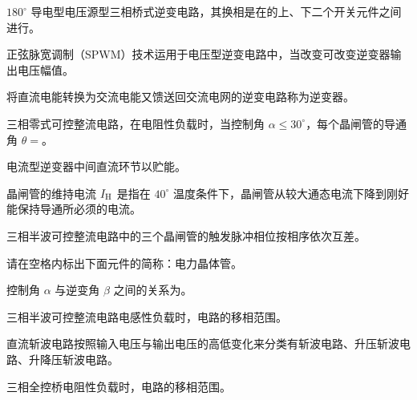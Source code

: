 \documentclass[电力电子]{subfiles}
\begin{document}
\begin{ti}
	$180^\circ$ 导电型电压源型三相桥式逆变电路，其换相是在的上、下二个开关元件之间进行。
\end{ti}

\begin{ti}
	正弦脉宽调制（SPWM）技术运用于电压型逆变电路中，当改变可改变逆变器输出电压幅值。
\end{ti}

\begin{ti}
	将直流电能转换为交流电能又馈送回交流电网的逆变电路称为逆变器。
\end{ti}

\begin{ti}
	三相零式可控整流电路，在电阻性负载时，当控制角 $\alpha \leq 30^\circ$，每个晶闸管的导通角 $\theta = $。
\end{ti}

\begin{ti}
	电流型逆变器中间直流环节以贮能。
\end{ti}

\begin{ti}
	晶闸管的维持电流 $I_{\mathrm{H}}$ 是指在 $40^\circ$ 温度条件下，晶闸管从较大通态电流下降到刚好能保持导通所必须的电流。
\end{ti}

\begin{ti}
	三相半波可控整流电路中的三个晶闸管的触发脉冲相位按相序依次互差。
\end{ti}

\begin{ti}
	请在空格内标出下面元件的简称：电力晶体管。
\end{ti}

\begin{ti}
	控制角 $\alpha$ 与逆变角 $\beta$ 之间的关系为\hua{$\beta = \uppi - \alpha$}。
\end{ti}

\begin{ti}
	三相半波可控整流电路电感性负载时，电路的移相范围。
\end{ti}

\begin{ti}
	直流斩波电路按照输入电压与输出电压的高低变化来分类有斩波电路、升压斩波电路、升降压斩波电路。
\end{ti}

\begin{ti}
	三相全控桥电阻性负载时，电路的移相范围。
\end{ti}
\end{document}
